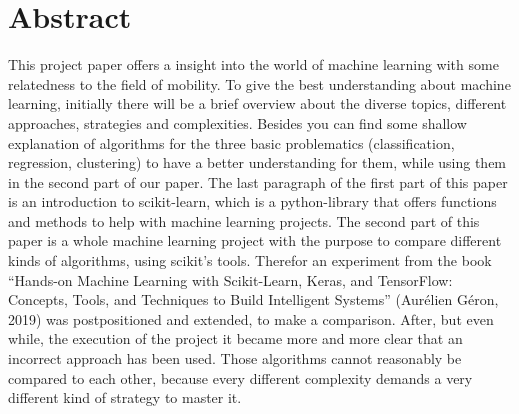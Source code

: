 \section*{Abstract}
This project paper offers a insight into the world of machine learning with some relatedness to the field of mobility. 
To give the best understanding about machine learning, initially there will be a brief overview about the diverse topics, different approaches, strategies and complexities. Besides you can find some shallow explanation of algorithms for the three basic problematics (classification, regression, clustering) to have a better understanding for them, while using them in the second part of our paper.
The last paragraph of the first part of this paper is an introduction to scikit-learn, which is a python-library that offers functions and methods to help with machine learning projects.
The second part of this paper is a whole machine learning project with the purpose to compare different kinds of algorithms, using scikit’s tools. Therefor an experiment from the book “Hands-on Machine Learning with Scikit-Learn, Keras, and TensorFlow: Concepts, Tools, and Techniques to Build Intelligent Systems” (Aurélien Géron, 2019) was postpositioned and extended, to make a comparison.
After, but even while, the execution of the project it became more and more clear that an incorrect approach has been used. Those algorithms cannot reasonably be compared to each other, because every different complexity demands a very different kind of strategy to master it. 
\vfill\vfill\vfill\vfill\vfill\vfill